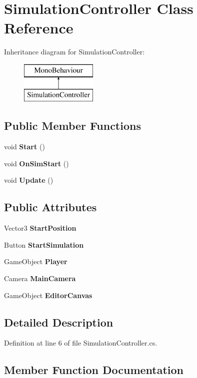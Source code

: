 \section{Simulation\+Controller Class Reference}
\label{class_simulation_controller}
Inheritance diagram for Simulation\+Controller\+:\begin{figure}[H]
\begin{center}
\leavevmode
\includegraphics[height=2.000000cm]{class_simulation_controller}
\end{center}
\end{figure}
\subsection*{Public Member Functions}
\begin{DoxyCompactItemize}
\item 
void \textbf{ Start} ()
\item 
void \textbf{ On\+Sim\+Start} ()
\item 
void \textbf{ Update} ()
\end{DoxyCompactItemize}
\subsection*{Public Attributes}
\begin{DoxyCompactItemize}
\item 
Vector3 \textbf{ Start\+Position}
\item 
Button \textbf{ Start\+Simulation}
\item 
Game\+Object \textbf{ Player}
\item 
Camera \textbf{ Main\+Camera}
\item 
Game\+Object \textbf{ Editor\+Canvas}
\end{DoxyCompactItemize}


\subsection{Detailed Description}


Definition at line 6 of file Simulation\+Controller.\+cs.



\subsection{Member Function Documentation}
\mbox{\label{class_simulation_controller_a33a1abfaa32770f9fcea6db6cf626dd8}} 
